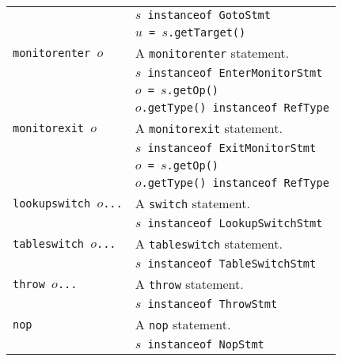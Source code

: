 \documentclass{article}
\begin{document}
\begin{scriptsize}
\begin{tabular}{ll}
                & \texttt{$s$ instanceof GotoStmt}\\
                & \texttt{$u$ = $s$.getTarget()}\\
\hline
\texttt{monitorenter $o$}    & A \texttt{monitorenter} statement.\\
                & \texttt{$s$ instanceof EnterMonitorStmt}\\
                & \texttt{$o$ = $s$.getOp()}\\
                & \texttt{$o$.getType() instanceof RefType}\\
\hline
\texttt{monitorexit $o$}    & A \texttt{monitorexit} statement.\\
                & \texttt{$s$ instanceof ExitMonitorStmt}\\
                & \texttt{$o$ = $s$.getOp()}\\
                & \texttt{$o$.getType() instanceof RefType}\\
\hline
\texttt{lookupswitch $o$...}    & A \texttt{switch} statement.\\
                & \texttt{$s$ instanceof LookupSwitchStmt}\\
\hline
\texttt{tableswitch $o$...}    & A \texttt{tableswitch} statement.\\
                & \texttt{$s$ instanceof TableSwitchStmt}\\
\hline
\texttt{throw $o$...}    & A \texttt{throw} statement.\\
                & \texttt{$s$ instanceof ThrowStmt}\\
\hline
\texttt{nop}    & A \texttt{nop} statement.\\
                & \texttt{$s$ instanceof NopStmt}\\
\hline
\end{tabular}
\end{scriptsize}
\end{document}
